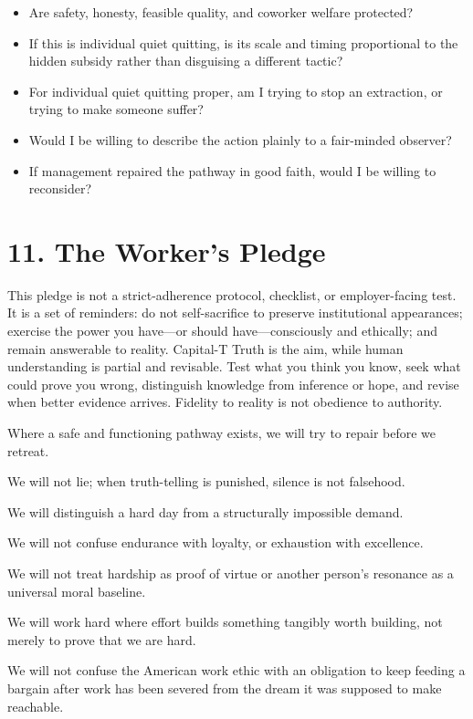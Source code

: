 \documentclass[11pt,oneside]{article}
\begin{document}
\begin{itemize}
  condition before the fully compliant action-set disappears?
\item
  Are safety, honesty, feasible quality, and coworker welfare protected?
\item
  If this is individual quiet quitting, is its scale and timing
  proportional to the hidden subsidy rather than disguising a different
  tactic?
\item
  For individual quiet quitting proper, am I trying to stop an
  extraction, or trying to make someone suffer?
\item
  Would I be willing to describe the action plainly to a fair-minded
  observer?
\item
  If management repaired the pathway in good faith, would I be willing
  to reconsider?
\end{itemize}

\hypertarget{the-workers-pledge}{%
\section{11. The Worker's Pledge}\label{the-workers-pledge}}

This pledge is not a strict-adherence protocol, checklist, or
employer-facing test. It is a set of reminders: do not self-sacrifice to
preserve institutional appearances; exercise the power you have---or
should have---consciously and ethically; and remain answerable to
reality. Capital-T Truth is the aim, while human understanding is
partial and revisable. Test what you think you know, seek what could
prove you wrong, distinguish knowledge from inference or hope, and
revise when better evidence arrives. Fidelity to reality is not
obedience to authority.

Where a safe and functioning pathway exists, we will try to repair
before we retreat.

We will not lie; when truth-telling is punished, silence is not
falsehood.

We will distinguish a hard day from a structurally impossible demand.

We will not confuse endurance with loyalty, or exhaustion with
excellence.

We will not treat hardship as proof of virtue or another person's
resonance as a universal moral baseline.

We will work hard where effort builds something tangibly worth building,
not merely to prove that we are hard.

We will not confuse the American work ethic with an obligation to keep
feeding a bargain after work has been severed from the dream it was
supposed to make reachable.
\end{document}
